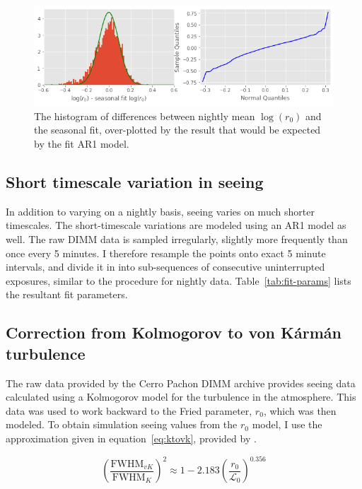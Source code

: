 \documentclass[DM,authoryear,toc]{lsstdoc}
\begin{document}
\begin{figure}
  \includegraphics[width=\columnwidth]{./figures/night_ar1_dist.png}
  \caption{The histogram of differences between nightly mean
    $\log(r_0)$ and the seasonal fit, over-plotted by the result that
    would be expected by the fit AR1 model.}
  \label{fig:night-ar1-dist}
\end{figure}

\subsection{Short timescale variation in seeing}
\label{sec:short-variation}

In addition to varying on a nightly basis, seeing varies on much
shorter timescales. The short-timescale variations are modeled using
an AR1 model as well. The raw DIMM data is sampled irregularly,
slightly more frequently than once every 5 minutes. I therefore
resample the points onto exact 5 minute intervals, and divide it in into
sub-sequences of consecutive uninterrupted exposures, similar to the
procedure for nightly data. Table~\ref{tab:fit-params} lists the
resultant fit parameters.

\subsection{Correction from Kolmogorov to von K\'arm\'an turbulence}
\label{sec:vkcorr}

The raw data provided by the Cerro Pachon DIMM archive provides seeing
data calculated using a Kolmogorov model for the turbulence in the
atmosphere. This data was used to work backward to the Fried
parameter, $r_0$, which was then modeled. To obtain simulation seeing
values from the $r_0$ model, I use the approximation given in
equation~\ref{eq:ktovk}, provided by \cite{2002PASP..114.1156T}.

\begin{equation} \label{eq:ktovk}
\left( \frac{\mbox{FWHM}_{vK}}{\mbox{FWHM}_{K}} \right)^2
\approx 1 - 2.183 \left( \frac{r_0}{\mathcal{L}_0} \right)^{0.356}
\end{equation}
\end{document}
